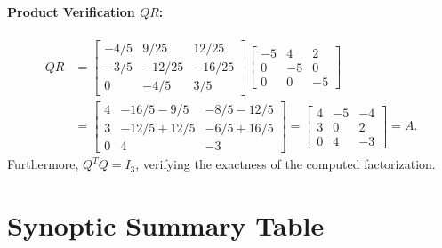 \begin{example}
\paragraph{Product Verification $Q R$:}
\begin{align}
    Q R &= \begin{bmatrix} 
    -4/5 & 9/25 & 12/25 \\ 
    -3/5 & -12/25 & -16/25 \\ 
    0 & -4/5 & 3/5 
    \end{bmatrix}
    \begin{bmatrix} 
    -5 & 4 & 2 \\ 
    0 & -5 & 0 \\ 
    0 & 0 & -5 
    \end{bmatrix} \nonumber\\[6pt]
    &= \begin{bmatrix}
    4 & -16/5 - 9/5 & -8/5 - 12/5 \\
    3 & -12/5 + 12/5 & -6/5 + 16/5 \\
    0 & 4 & -3
    \end{bmatrix}
    = \begin{bmatrix} 
    4 & -5 & -4 \\ 
    3 & 0 & 2 \\ 
    0 & 4 & -3 
    \end{bmatrix} = A.
\end{align}
Furthermore, $Q^T Q = I_3$, verifying the exactness of the computed factorization.
\end{example}

\FloatBarrier
\section{Synoptic Summary Table}
\label{sec:synoptic-summary-qr-en}

